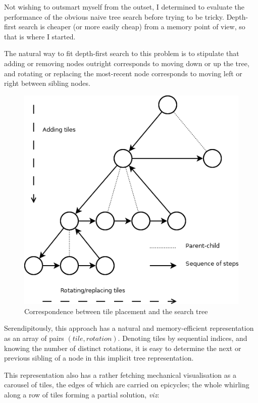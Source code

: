 \documentclass[a4paper,12pt]{article}
\begin{document}
Not wishing to outsmart myself from the outset, I determined to
evaluate the performance of the obvious naive tree search before
trying to be tricky. Depth-first search is cheaper (or more easily
cheap) from a memory point of view, so that is where I started.

The natural way to fit depth-first search to this problem is to
stipulate that adding or removing nodes outright corresponds to moving
down or up the tree, and rotating or replacing the most-recent node
corresponds to moving left or right between sibling nodes.

\begin{figure}
  
  \begin{center}
    \includegraphics[scale=0.5]{tree}
    \caption{Correspondence between tile placement and the search tree}
  \end{center}
  
\end{figure}

Serendipitously, this approach has a natural and memory-efficient
representation as an array of pairs $(tile, rotation)$. Denoting tiles
by sequential indices, and knowing the number of distinct rotations,
it is easy to determine the next or previous sibling of a node in this
implicit tree representation.

This representation also has a rather fetching mechanical
visualisation as a carousel of tiles, the edges of which are carried
on epicycles; the whole whirling along a row of tiles forming a
partial solution, \textit{viz}:
\end{document}
